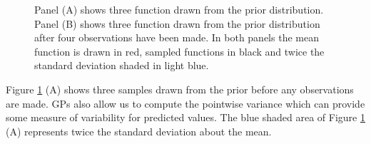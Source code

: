 \begin{figure}[h]
{\begin{adjustbox}{width=0.48\textwidth}
        \end{adjustbox}
    }
    \caption{Panel (A) shows three function drawn from the prior distribution. Panel (B) shows three function drawn from the prior distribution after four observations have been made. In both panels the mean function is drawn in red, sampled functions in black and twice the standard deviation shaded in light blue.}
    \label{fig: GP_func_samples}
\end{figure}

Figure \ref{fig: GP_func_samples} (A) shows three samples drawn from the prior before any observations are made. GPs also allow us to compute the pointwise variance which can provide some measure of variability for predicted values. The blue shaded area of Figure \ref{fig: GP_func_samples} (A) represents twice the standard deviation about the mean.

